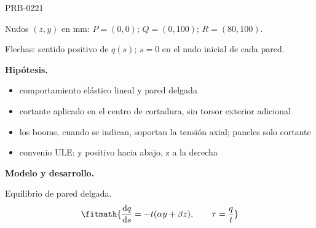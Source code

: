 \begin{studiumworked}{PRB-0221}
\par\medskip\noindent\begin{minipage}{\linewidth}\centering
{}
\par\small Nudos $(z,y)$ en mm: $P=(0,0)$; $Q=(0,100)$; $R=(80,100)$.
\par\small Flechas: sentido positivo de $q(s)$; $s=0$ en el nudo inicial de cada pared.
\par\normalsize\end{minipage}\par\medskip

\textbf{Hipótesis.}\begin{itemize}\item comportamiento elástico lineal y pared delgada
\item cortante aplicado en el centro de cortadura, sin torsor exterior adicional
\item los booms, cuando se indican, soportan la tensión axial; paneles solo cortante
\item convenio ULE: y positivo hacia abajo, z a la derecha\end{itemize}

\textbf{Modelo y desarrollo.}

Equilibrio de pared delgada.\[\fitmath{\frac{\mathrm{d}q}{\mathrm{d}s}=-t(\alpha y+\beta z),\qquad \tau=\frac{q}{t}}\]


\end{studiumworked}
